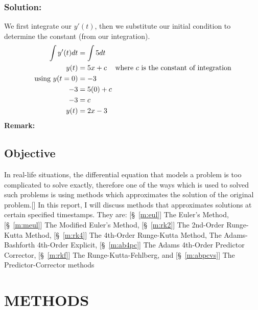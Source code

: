 \documentclass[12pt,oneside]{book}
\begin{document}
\begin{spacing}{1.2}
				\subsection*{Solution:}
					We first integrate our $ y'(t) $, then we substitute our initial condition to determine the constant (from our integration).
					\begin{equation*}
						\begin{split}
							\int y'(t) dt & = \int 5 dt \\
							 y(t) & = 5x + c \hspace*{0.3cm} \text{ where $ c $ is the constant of integration} \\
							 \text{using } y(t = 0) & = -3 \\
							 -3 & = 5(0) + c \\
							 -3 & = c \\
							 y(t) & = 2x - 3
						\end{split}
					\end{equation*}
					\textbf{Remark: }  
			
			
			\section{Objective}
				In real-life situations, the differential equation that models a problem is too complicated to solve exactly, therefore one of the ways which is used to solved such problems is using methods which approximates the solution of the original problem.[] In this report, I will discuss methods that approximates solutions at certain specified timestamps. \newline
				They are: [\S\ \ref{m:eul}] The Euler's Method, [\S\ \ref{m:meul}] The Modified Euler's Method, [\S\ \ref{m:rk2}] The 2nd-Order Runge-Kutta Method, [\S\ \ref{m:rk4}] The 4th-Order Runge-Kutta Method, \newline [\S\ \ref{m:ab4e}] The Adams-Bashforth 4th-Order Explicit, [\S\ \ref{m:ab4pc}] The Adams 4th-Order Predictor Corrector, [\S\ \ref{m:rkf}] The Runge-Kutta-Fehlberg, and [\S\ \ref{m:abpcvs}] The Predictor-Corrector methods
			
		\end{spacing}
		
	
	\chapter{METHODS}
\end{document}

